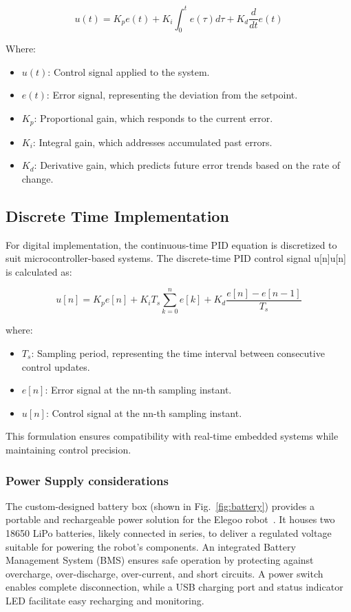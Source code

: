 \begin{equation}
	u(t) = K_p e(t) + K_i \int_0^t e(\tau)d\tau + K_d \frac{d}{dt}e(t)
\end{equation}

Where:
\begin{itemize}
	\item $u(t)$: Control signal applied to the system.
	\item $e(t)$: Error signal, representing the deviation from the setpoint.
	\item $K_p$: Proportional gain, which responds to the current error.
	\item $K_i$: Integral gain, which addresses accumulated past errors.
	\item $K_d$: Derivative gain, which predicts future error trends based on the rate of change.
\end{itemize}

\subsection{Discrete Time Implementation}
For digital implementation, the continuous-time PID equation is discretized to suit microcontroller-based systems. The discrete-time PID control signal u[n]u[n] is calculated as:

\begin{equation}
	u[n] = K_p e[n] + K_i T_s \sum_{k=0}^n e[k] + K_d \frac{e[n] - e[n-1]}{T_s}
\end{equation}

where:
\begin{itemize}
 \item $T_s$: Sampling period, representing the time interval between consecutive control updates.
 \item $e[n]$: Error signal at the nn-th sampling instant.
 \item $u[n]$: Control signal at the nn-th sampling instant.
\end{itemize}
This formulation ensures compatibility with real-time embedded systems while maintaining control precision.


\subsubsection{Power Supply considerations}
The custom-designed battery box (shown in Fig.~\ref{fig:battery}) provides a portable and rechargeable power solution for the Elegoo robot~\cite{battery}. It houses two 18650 LiPo batteries, likely connected in series, to deliver a regulated voltage suitable for powering the robot’s components. An integrated Battery Management System (BMS) ensures safe operation by protecting against overcharge, over-discharge, over-current, and short circuits. A power switch enables complete disconnection, while a USB charging port and status indicator LED facilitate easy recharging and monitoring.  

